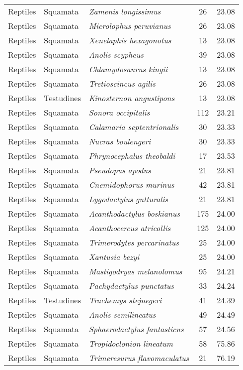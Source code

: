 \begin{longtable}{ll>{\itshape}lcc}
  Reptiles & Squamata & Zamenis longissimus &  26 & 23.08 \\ 
  Reptiles & Squamata & Microlophus peruvianus &  26 & 23.08 \\ 
  Reptiles & Squamata & Xenelaphis hexagonotus &  13 & 23.08 \\ 
  Reptiles & Squamata & Anolis scypheus &  39 & 23.08 \\ 
  Reptiles & Squamata & Chlamydosaurus kingii &  13 & 23.08 \\ 
  Reptiles & Squamata & Tretioscincus agilis &  26 & 23.08 \\ 
  Reptiles & Testudines & Kinosternon angustipons &  13 & 23.08 \\ 
  Reptiles & Squamata & Sonora occipitalis & 112 & 23.21 \\ 
  Reptiles & Squamata & Calamaria septentrionalis &  30 & 23.33 \\ 
  Reptiles & Squamata & Nucras boulengeri &  30 & 23.33 \\ 
  Reptiles & Squamata & Phrynocephalus theobaldi &  17 & 23.53 \\ 
  Reptiles & Squamata & Pseudopus apodus &  21 & 23.81 \\ 
  Reptiles & Squamata & Cnemidophorus murinus &  42 & 23.81 \\ 
  Reptiles & Squamata & Lygodactylus gutturalis &  21 & 23.81 \\ 
  Reptiles & Squamata & Acanthodactylus boskianus & 175 & 24.00 \\ 
  Reptiles & Squamata & Acanthocercus atricollis & 125 & 24.00 \\ 
  Reptiles & Squamata & Trimerodytes percarinatus &  25 & 24.00 \\ 
  Reptiles & Squamata & Xantusia bezyi &  25 & 24.00 \\ 
  Reptiles & Squamata & Mastigodryas melanolomus &  95 & 24.21 \\ 
  Reptiles & Squamata & Pachydactylus punctatus &  33 & 24.24 \\ 
  Reptiles & Testudines & Trachemys stejnegeri &  41 & 24.39 \\ 
  Reptiles & Squamata & Anolis semilineatus &  49 & 24.49 \\ 
  Reptiles & Squamata & Sphaerodactylus fantasticus &  57 & 24.56 \\ 
  Reptiles & Squamata & Tropidoclonion lineatum &  58 & 75.86 \\ 
  Reptiles & Squamata & Trimeresurus flavomaculatus &  21 & 76.19 \\ 

\end{longtable}
